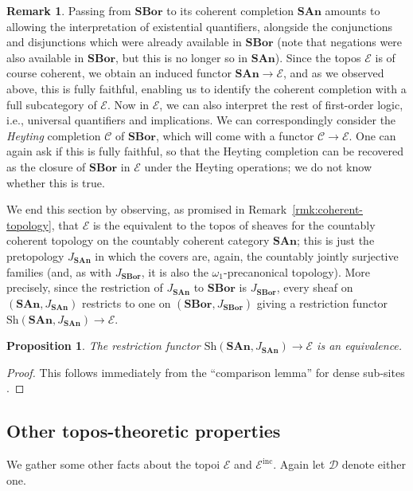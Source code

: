 \documentclass[11pt]{amsart}
\newcommand\cC{\mathcal{C}}
\newcommand\cD{\mathcal{D}}
\newcommand\cE{\mathcal{E}}
\newcommand\inc{\mathrm{inc}}
\newcommand\SAn{\mathbf{SAn}}
\newcommand\SBor{\mathbf{SBor}}
\newcommand\Sh{\mathrm{Sh}}
\theoremstyle{definition}
\newtheorem{rmk}[defn]{Remark}
\theoremstyle{remark}
\theoremstyle{plain}
\newtheorem{propn}[defn]{Proposition}
\begin{document}
\begin{rmk}
  Passing from \( \SBor \) to its coherent completion \( \SAn \) amounts to allowing the interpretation of existential quantifiers, alongside the conjunctions and disjunctions which were already available in \( \SBor \) (note that negations were also available in \( \SBor \), but this is no longer so in \( \SAn \)).
  Since the topos \( \cE \) is of course coherent, we obtain an induced functor \( \SAn \to \cE \), and as we observed above, this is fully faithful, enabling us to identify the coherent completion with a full subcategory of \( \cE \).
  Now in \( \cE \), we can also interpret the rest of first-order logic, i.e., universal quantifiers and implications.
  We can correspondingly consider the \emph{Heyting} completion \( \cC \) of \( \SBor \), which will come with a functor \( \cC \to \cE \).
  One can again ask if this is fully faithful, so that the Heyting completion can be recovered as the closure of \( \SBor \) in \( \cE \) under the Heyting operations; we do not know whether this is true.
\end{rmk}

We end this section by observing, as promised in Remark~\ref{rmk:coherent-topology}, that \( \cE \) is the equivalent to the topos of sheaves for the countably coherent topology on the countably coherent category \( \SAn \); this is just the pretopology \( J_{\SAn} \) in which the covers are, again, the countably jointly surjective families (and, as with \( J_{\SBor} \), it is also the \( \omega_1 \)-precanonical topology).
More precisely, since the restriction of \( J_{\SAn} \) to \( \SBor \) is \( J_{\SBor} \), every sheaf on \( (\SAn, J_{\SAn}) \) restricts to one on \( (\SBor, J_{\SBor}) \) giving a restriction functor \( \Sh(\SAn, J_{\SAn}) \to \cE \).

\begin{propn}
  The restriction functor \( \Sh(\SAn, J_{\SAn}) \to \cE \) is an equivalence.
\end{propn}

\begin{proof}
  This follows immediately from the ``comparison lemma'' for dense sub-sites \cite[Theorem~III.4.1]{sga-4-1}.
\end{proof}

\subsection{Other topos-theoretic properties} \label{subsec:more-topos-props}
We gather some other facts about the topoi \( \cE \) and \( \cE^\inc \).
Again let \( \cD \) denote either one.
\end{document}
